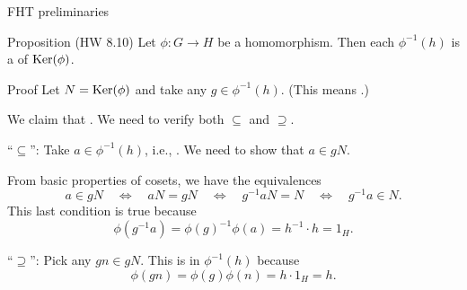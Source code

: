 \documentclass[8pt]{beamer}
\newcommand{\Pause}{}      %
\begin{document}
\begin{frame}{FHT preliminaries}
  
  \begin{block}{Proposition (HW 8.10)}
    Let $\phi\colon G\to H$ be a homomorphism. Then each
     $\phi^{-1}(h)$ is a  of
    $\operatorname{Ker}(\phi)$.
  \end{block}
  
  \begin{exampleblock}{Proof} \Pause
    Let $N=\operatorname{Ker}(\phi)$ and take any $g\in\phi^{-1}(h)$. (This means
    .) \medskip\Pause
    
    We claim that . \Pause We need to verify both
    $\subseteq$ and $\supseteq$. \medskip\pause
    
    ``$\subseteq$'': Take $a\in\phi^{-1}(h)$, i.e.,
    . \Pause We need to show that 
    $a\in gN$. \medskip\pause
    
    From basic properties of cosets, we have the equivalences
    \[
    a\in gN\Pause\quad\Longleftrightarrow\quad 
    aN=gN\Pause\quad\Longleftrightarrow\quad 
    g^{-1}aN=N \Pause\quad\Longleftrightarrow\quad 
    g^{-1}a\in N.
    \]
    \Pause This last condition is true because
    \[
    \phi(g^{-1}a)\Pause=\phi(g)^{-1}\phi(a)\Pause
    =h^{-1}\cdot h=1_H. \tag*{$\checkmark$}
    \]
    \pause
    
    ``$\supseteq$'': Pick any $gn\in gN$. \Pause This is in
    $\phi^{-1}(h)$ because
    \[
    \phi(gn)\Pause=\phi(g)\phi(n)\Pause=h\cdot 1_H\Pause=h. \tag*{$\checkmark$}
    \]
    \vspace{-3mm}
  \end{exampleblock}
    
\end{frame}

\end{document}
